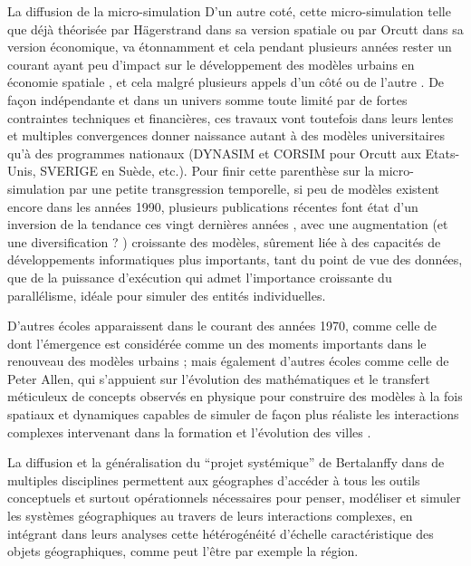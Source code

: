 \begin{testiv}{La diffusion de la micro-simulation}{}
D'un autre coté, cette micro-simulation telle que déjà théorisée par Hägerstrand dans sa version spatiale ou par Orcutt dans sa version économique, va étonnamment et cela pendant plusieurs années rester un courant ayant peu d'impact sur le développement des modèles urbains en économie spatiale \autocite[5]{Sanders2006}, et cela malgré plusieurs appels d'un côté \autocite{Hagerstrand1970} ou de l'autre \autocite[5]{Isard1998}. De façon indépendante et dans un univers somme toute limité par de fortes contraintes techniques et financières, ces travaux vont toutefois dans leurs lentes et multiples convergences donner naissance autant à des modèles universitaires qu'à des programmes nationaux (DYNASIM et CORSIM pour Orcutt aux Etats-Unis, SVERIGE en Suède, etc.). Pour finir cette parenthèse sur la micro-simulation par une petite transgression temporelle, si peu de modèles existent encore dans les années 1990, plusieurs publications récentes font état d'un inversion de la tendance ces vingt dernières années \autocite{Lenormand2013}, avec une augmentation (et une diversification ? ) croissante des modèles, sûrement liée à des capacités de développements informatiques plus importants, tant du point de vue des données, que de la puissance d’exécution qui admet l'importance croissante du parallélisme, idéale pour simuler des entités individuelles. \autocites[5]{Sanders2006}{Lenormand2013}

\end{testiv}

D'autres écoles apparaissent dans le courant des années 1970, comme celle de \textcite{Wilson1970} dont l'émergence est considérée comme un des moments importants dans le renouveau des modèles urbains \autocite{Griffith2010}; mais également d'autres écoles comme celle de Peter Allen, qui s'appuient sur l'évolution des mathématiques et le transfert méticuleux de concepts observés en physique pour construire des modèles à la fois spatiaux et dynamiques capables de simuler de façon plus réaliste les interactions complexes intervenant dans la formation et l'évolution des villes \autocites[11]{Batty1976}{Batty2001}[27-28]{Pumain2003}.

La diffusion et la généralisation du \enquote{projet systémique} de Bertalanffy dans de multiples disciplines permettent aux géographes d'accéder à tous les outils conceptuels et surtout opérationnels \autocite{Forrester1969} nécessaires pour penser, modéliser et simuler les systèmes géographiques au travers de leurs interactions complexes, en intégrant dans leurs analyses cette hétérogénéité d'échelle caractéristique des objets géographiques, comme peut l'être par exemple la région.

